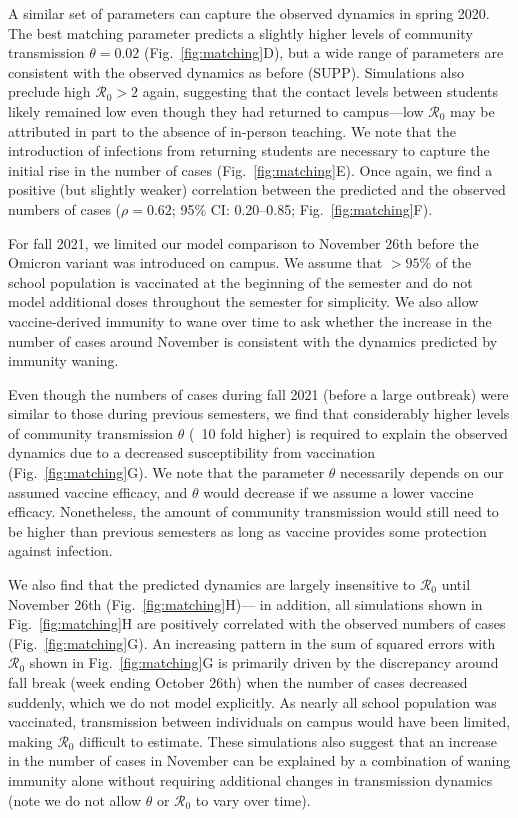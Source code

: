 \documentclass[12pt]{article}
\newcommand{\fref}[1]{Fig.~\ref{fig:#1}}
\begin{document}
A similar set of parameters can capture the observed dynamics in spring 2020.
The best matching parameter predicts a slightly higher levels of community transmission $\theta=0.02$ (\fref{matching}D), but a wide range of parameters are consistent with the observed dynamics as before (SUPP). 
Simulations also preclude high $\mathcal R_0 > 2$ again, suggesting that the contact levels between students likely remained low even though they had returned to campus---low $\mathcal R_0$ may be attributed in part to the absence of in-person teaching.
We note that the introduction of infections from returning students are necessary to capture the initial rise in the number of cases (\fref{matching}E).
Once again, we find a positive (but slightly weaker) correlation between the predicted and the observed numbers of cases ($\rho = 0.62$; 95\% CI: 0.20--0.85; \fref{matching}F).

For fall 2021, we limited our model comparison to November 26th before the Omicron variant was introduced on campus.
We assume that $>95\%$ of the school population is vaccinated at the beginning of the semester and do not model additional doses throughout the semester for simplicity.
We also allow vaccine-derived immunity to wane over time to ask whether the increase in the number of cases around November is consistent with the dynamics predicted by immunity waning.

Even though the numbers of cases during fall 2021 (before a large outbreak) were similar to those during previous semesters, we find that considerably higher levels of community transmission $\theta$ (~10 fold higher) is required to explain the observed dynamics due to a decreased susceptibility from vaccination (\fref{matching}G).
We note that the parameter $\theta$ necessarily depends on our assumed vaccine efficacy, and $\theta$ would decrease if we assume a lower vaccine efficacy.
Nonetheless, the amount of community transmission would still need to be higher than previous semesters as long as vaccine provides some protection against infection.

We also find that the predicted dynamics are largely insensitive to $\mathcal R_0$ until November 26th (\fref{matching}H)---
in addition, all simulations shown in \fref{matching}H are positively correlated with the observed numbers of cases (\fref{matching}G). 
An increasing pattern in the sum of squared errors with $\mathcal R_0$ shown in \fref{matching}G is primarily driven by the discrepancy around fall break (week ending October 26th) when the number of cases decreased suddenly, which we do not model explicitly.
As nearly all school population was vaccinated, transmission between individuals on campus would have been limited, making $\mathcal R_0$ difficult to estimate.
These simulations also suggest that an increase in the number of cases in November can be explained by a combination of waning immunity alone without requiring additional changes in transmission dynamics (note we do not allow $\theta$ or $\mathcal R_0$ to vary over time).
\end{document}
